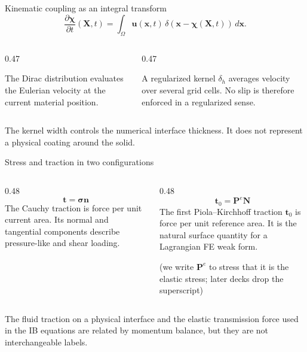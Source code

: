 \documentclass[aspectratio=169,11pt]{beamer}
\newcommand{\xvec}{\bm{x}}
\newcommand{\Xvec}{\bm{X}}
\newcommand{\uvec}{\bm{u}}
\newcommand{\Pten}{\bm{P}^{e}}
\newcommand{\stress}{\bm{\sigma}}
\newcommand{\normal}{\bm{N}}
\newcommand{\currentnormal}{\bm{n}}
\begin{document}
\begin{frame}{Kinematic coupling as an integral transform}
\[
\frac{\partial\bm{\chi}}{\partial t}(\Xvec,t)
=\int_{\Omega}\uvec(\xvec,t)\,
\delta\!\left(\xvec-\bm{\chi}(\Xvec,t)\right)\,d\xvec.
\]

\begin{columns}[T,onlytextwidth]
\begin{column}{0.47\textwidth}

The Dirac distribution evaluates the Eulerian velocity at the current material position.
\end{column}
\begin{column}{0.47\textwidth}

A regularized kernel \(\delta_h\) averages velocity over several grid cells. No slip is therefore enforced in a regularized sense.
\end{column}
\end{columns}

\vfill
\begin{punchbox}
The kernel width controls the numerical interface thickness. It does not represent a physical coating around the solid.
\end{punchbox}
\end{frame}

\begin{frame}{Stress and traction in two configurations}
\begin{columns}[T,onlytextwidth]
\begin{column}{0.48\textwidth}
\[
\bm{t}=\stress\currentnormal
\]
The Cauchy traction is force per unit current area. Its normal and tangential components describe pressure-like and shear loading.
\end{column}
\begin{column}{0.48\textwidth}
\[
\bm{t}_0=\Pten\normal
\]
The first Piola--Kirchhoff traction \(\bm{t}_0\) is force per unit reference area. It is the natural surface quantity for a Lagrangian FE weak form.

\smallskip
{\scriptsize (we write \(\bm{P}^{e}\) to stress that it is the elastic stress; later decks drop the superscript)}
\end{column}
\end{columns}

\medskip
\begin{punchbox}
The fluid traction on a physical interface and the elastic transmission force used in the IB equations are related by momentum balance, but they are not interchangeable labels.
\end{punchbox}
\end{frame}
\end{document}
